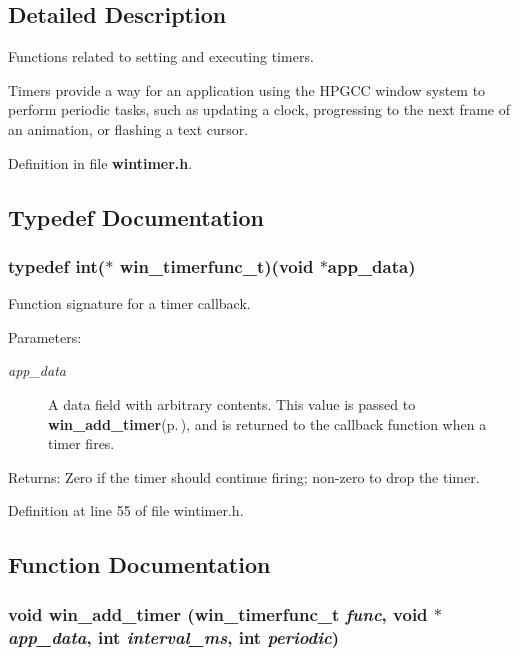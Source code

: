 \subsection{Detailed Description}
Functions related to setting and executing timers. 

Timers provide a way for an application using the HPGCC window system to perform periodic tasks, such as updating a clock, progressing to the next frame of an animation, or flashing a text cursor. 

Definition in file {\bf wintimer.h}.

\subsection{Typedef Documentation}
\subsubsection{\setlength{\rightskip}{0pt plus 5cm}typedef int($\ast$ {\bf win\_\-timerfunc\_\-t})(void $\ast$app\_\-data)}\label{wintimer_8h_a0}


Function signature for a timer callback. 

\begin{Desc}
\item[Parameters:]
\begin{description}
\item[{\em app\_\-data}]A data field with arbitrary contents. This value is passed to {\bf win\_\-add\_\-timer}{\rm (p.\,\pageref{wintimer_8h_a1})}, and is returned to the callback function when a timer fires.\end{description}
\end{Desc}
\begin{Desc}
\item[Returns:]Zero if the timer should continue firing; non-zero to drop the timer. \end{Desc}


Definition at line 55 of file wintimer.h.

\subsection{Function Documentation}
\subsubsection{\setlength{\rightskip}{0pt plus 5cm}void win\_\-add\_\-timer ({\bf win\_\-timerfunc\_\-t} {\em func}, void $\ast$ {\em app\_\-data}, int {\em interval\_\-ms}, int {\em periodic})}\label{wintimer_8h_a1}


